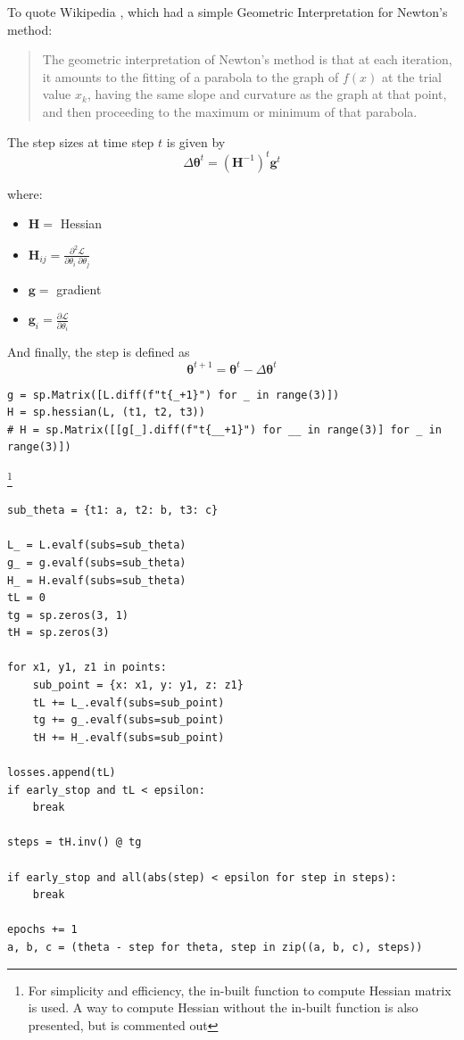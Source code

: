 \documentclass{report}
\begin{document}
To quote Wikipedia \cite{enwiki:Newtons_method}, which had a simple Geometric Interpretation for Newton's method:

\begin{quote}
    The geometric interpretation of Newton's method is that at each iteration, it amounts to the fitting of a parabola to the graph of $f(x)$ at the trial value $x_{k}$, having the same slope and curvature as the graph at that point, and then proceeding to the maximum or minimum of that parabola.
\end{quote}\label{quote:Newton's method}

The step sizes at time step $t$ is given by $$\Delta\boldsymbol{\theta}^t = (\boldsymbol{H}^{-1})^{t}\boldsymbol{g}^{t}$$

where:
\begin{itemize}
    \item $\boldsymbol{H} = $ Hessian
    \item[] \quad \quad $\boldsymbol{H}_{ij} = \frac{\partial^2 \mathcal{L}}{\partial\theta_i \ \partial\theta_j}$
    \item $\boldsymbol{g} = $ gradient
    \item[] \quad \quad $\boldsymbol{g}_i = \frac{\partial\mathcal{L}}{\partial\theta_i}$
\end{itemize}

And finally, the step is defined as
$$\boldsymbol{\theta}^{t+1} = \boldsymbol{\theta}^{t} - \Delta\boldsymbol{\theta}^t$$

\begin{lstlisting}[caption={Initialization of Gradient and Hessian}]
g = sp.Matrix([L.diff(f"t{_+1}") for _ in range(3)])
H = sp.hessian(L, (t1, t2, t3))
# H = sp.Matrix([[g[_].diff(f"t{__+1}") for __ in range(3)] for _ in range(3)])
\end{lstlisting}\footnote{For simplicity and efficiency, the in-built function to compute Hessian matrix is used. A way to compute Hessian without the in-built function is also presented, but is commented out}

\begin{lstlisting}[caption={A single epoch}, label={code:step}]
sub_theta = {t1: a, t2: b, t3: c}

L_ = L.evalf(subs=sub_theta)
g_ = g.evalf(subs=sub_theta)
H_ = H.evalf(subs=sub_theta)
tL = 0
tg = sp.zeros(3, 1)
tH = sp.zeros(3)

for x1, y1, z1 in points:
    sub_point = {x: x1, y: y1, z: z1}
    tL += L_.evalf(subs=sub_point)
    tg += g_.evalf(subs=sub_point)
    tH += H_.evalf(subs=sub_point)

losses.append(tL)
if early_stop and tL < epsilon:
    break

steps = tH.inv() @ tg

if early_stop and all(abs(step) < epsilon for step in steps):
    break

epochs += 1
a, b, c = (theta - step for theta, step in zip((a, b, c), steps))
\end{lstlisting}
\end{document}
